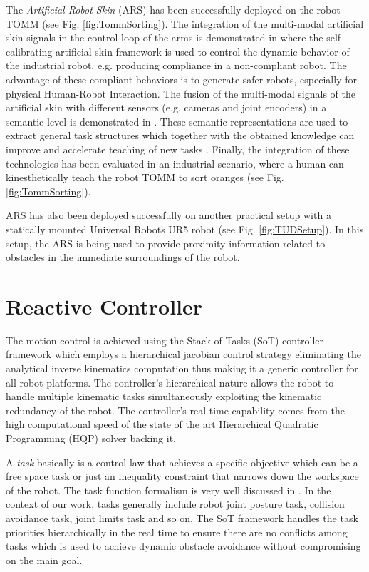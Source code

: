 The \textit{Artificial Robot Skin} (ARS) has been successfully deployed on the robot TOMM \cite{Dean-ICRA17} (see Fig. \ref{fig:TommSorting}). The integration of the multi-modal artificial skin signals in the control loop of the arms is demonstrated in \cite{Dean-Humanoids16} where the self-calibrating artificial skin framework is used to control the dynamic behavior of the industrial robot, e.g. producing compliance in a non-compliant robot. The advantage of these compliant behaviors is to generate safer robots, especially for physical Human-Robot Interaction. The fusion of the multi-modal signals of the artificial skin with different sensors (e.g. cameras and joint encoders) in a semantic level is demonstrated in \cite{Ramirez-Amaro-Humanoids16}. These semantic representations are used to extract general task structures which together with the obtained knowledge can improve and accelerate teaching of new tasks \cite{Dynaov-Humanoids16}. Finally, the integration of these technologies has been evaluated in an industrial scenario, where a human can kinesthetically teach the robot TOMM to sort oranges \cite{Dean-IECON16} (see Fig. \ref{fig:TommSorting}).

ARS has also been deployed successfully on another practical setup with a statically mounted Universal Robots UR5 robot (see Fig. \ref{fig:TUDSetup}). In this setup, the ARS is being used to provide proximity information related to obstacles in the immediate surroundings of the robot.


\section{Reactive Controller}
The motion control is achieved using the Stack of Tasks (SoT) controller
framework \cite{Mansard2009} which employs a hierarchical jacobian control strategy eliminating the analytical inverse kinematics computation thus making it a generic controller for all robot platforms. The controller's hierarchical nature allows the robot to handle multiple kinematic tasks simultaneously exploiting the kinematic redundancy of the robot. The controller's real time capability comes from the high computational speed of the state of the art Hierarchical Quadratic Programming (HQP) solver backing it. 


A \emph{task} basically is a control law that achieves a specific objective which can be a free space task or just an inequality constraint that narrows down the workspace of the robot. The task function formalism is very well discussed in \cite{C.Samson1991}. In the context of our work, tasks generally include robot joint posture task, collision avoidance task, joint limits task and so on. The SoT framework handles the task priorities hierarchically in the real time to ensure there are no conflicts among tasks which is used to achieve dynamic obstacle avoidance without compromising on the main goal.

